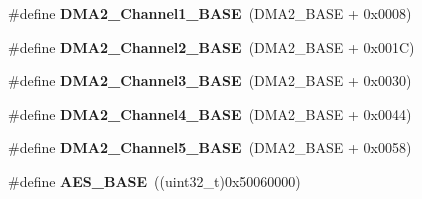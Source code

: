 \begin{DoxyCompactItemize}
\item 
\hypertarget{group___peripheral__memory__map_gad3bd6c4201d12f5d474518c1b02f8e3b}{\#define {\bfseries D\-M\-A2\-\_\-\-Channel1\-\_\-\-B\-A\-S\-E}~(D\-M\-A2\-\_\-\-B\-A\-S\-E + 0x0008)}\label{group___peripheral__memory__map_gad3bd6c4201d12f5d474518c1b02f8e3b}

\item 
\hypertarget{group___peripheral__memory__map_ga22f39f23c879c699b88e04a629f69d1c}{\#define {\bfseries D\-M\-A2\-\_\-\-Channel2\-\_\-\-B\-A\-S\-E}~(D\-M\-A2\-\_\-\-B\-A\-S\-E + 0x001\-C)}\label{group___peripheral__memory__map_ga22f39f23c879c699b88e04a629f69d1c}

\item 
\hypertarget{group___peripheral__memory__map_ga6f2369b8bc155fb55a28891987605c2c}{\#define {\bfseries D\-M\-A2\-\_\-\-Channel3\-\_\-\-B\-A\-S\-E}~(D\-M\-A2\-\_\-\-B\-A\-S\-E + 0x0030)}\label{group___peripheral__memory__map_ga6f2369b8bc155fb55a28891987605c2c}

\item 
\hypertarget{group___peripheral__memory__map_ga01b063266473f290a55047654fbbfbee}{\#define {\bfseries D\-M\-A2\-\_\-\-Channel4\-\_\-\-B\-A\-S\-E}~(D\-M\-A2\-\_\-\-B\-A\-S\-E + 0x0044)}\label{group___peripheral__memory__map_ga01b063266473f290a55047654fbbfbee}

\item 
\hypertarget{group___peripheral__memory__map_ga1eea983a5d68bf36f4d19fbb07955ca1}{\#define {\bfseries D\-M\-A2\-\_\-\-Channel5\-\_\-\-B\-A\-S\-E}~(D\-M\-A2\-\_\-\-B\-A\-S\-E + 0x0058)}\label{group___peripheral__memory__map_ga1eea983a5d68bf36f4d19fbb07955ca1}

\item 
\hypertarget{group___peripheral__memory__map_gad099ae8679538f6c00294639d67528bf}{\#define {\bfseries A\-E\-S\-\_\-\-B\-A\-S\-E}~((uint32\-\_\-t)0x50060000)}\label{group___peripheral__memory__map_gad099ae8679538f6c00294639d67528bf}


\end{DoxyCompactItemize}
